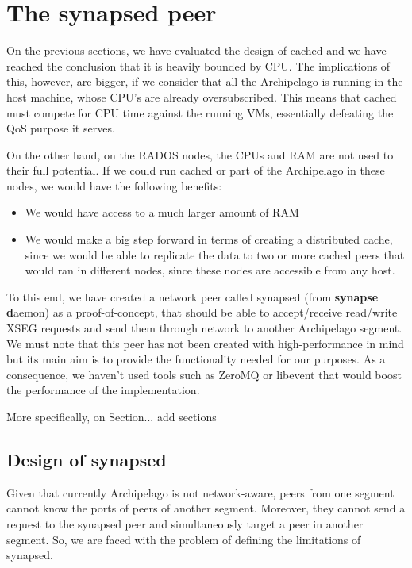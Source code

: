\chapter{The synapsed peer}\label{ch:synapsed}

On the previous sections, we have evaluated the design of cached and we have 
reached the conclusion that it is heavily bounded by CPU. The implications of 
this, however, are bigger, if we consider that all the Archipelago is running 
in the host machine, whose CPU's are already oversubscribed. This means that 
cached must compete for CPU time against the running VMs, essentially defeating 
the QoS purpose it serves.

On the other hand, on the RADOS nodes, the CPUs and RAM are not used to their 
full potential. If we could run cached or part of the Archipelago in these 
nodes, we would have the following benefits:

\begin{itemize}
	\item We would have access to a much larger amount of RAM
	\item We would make a big step forward in terms of creating a 
		distributed cache, since we would be able to replicate the data 
		to two or more cached peers that would ran in different nodes, 
		since these nodes are accessible from any host.
\end{itemize}

To this end, we have created a network peer called synapsed (from 
\textbf{synapse d}aemon) as a proof-of-concept, that should be able to 
accept/receive read/write XSEG requests and send them through network to 
another Archipelago segment. We must note that this peer has not been created 
with high-performance in mind but its main aim is to provide the functionality 
needed for our purposes.  As a consequence, we haven't used tools such as 
ZeroMQ or libevent that would boost the performance of the implementation.

More specifically, on Section...
\todo add sections

\section{Design of synapsed}

Given that currently Archipelago is not network-aware, peers from one segment 
cannot know the ports of peers of another segment. Moreover, they cannot send a 
request to the synapsed peer and simultaneously target a peer in another 
segment. So, we are faced with the problem of defining the limitations of 
synapsed.

